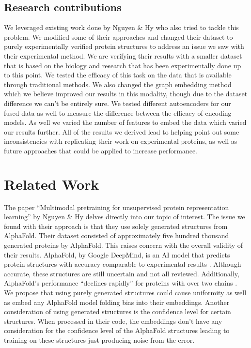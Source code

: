 \documentclass{article}
\begin{document}
\subsection{Research contributions}

We leveraged existing work done by Nguyen \& Hy \citeyearpar{nguyen_2024} who also tried to tackle this problem. We modified some of their approaches and changed their dataset to purely experimentally verified protein structures to address an issue we saw with their experimental method. We are verifying their results with a smaller dataset that is based on the biology and research that has been experimentally done up to this point. We tested the efficacy of this task on the data that is available through traditional methods. We also changed the graph embedding method which we believe improved our results in this modality, though due to the dataset difference we can’t be entirely sure. We tested different autoencoders for our fused data as well to measure the difference between the efficacy of encoding models. As well we varied the number of features to embed the data which varied our results further. All of the results we derived lead to helping point out some inconsistencies with replicating their work on experimental proteins, as well as future approaches that could be applied to increase performance.

\section{Related Work}
The paper “Multimodal pretraining for unsupervised protein representation learning” by Nguyen \& Hy \citeyearpar{nguyen_2024} delves directly into our topic of interest. The issue we found with their approach is that they use solely generated structures from AlphaFold. Their dataset consisted of approximately five hundred thousand generated proteins by AlphaFold. This raises concern with the overall validity of their results. AlphaFold, by Google DeepMind, is an AI model that predicts protein structures with accuracy comparable to experimental results \cite{alphafold}. Although accurate, these structures are still uncertain and not all reviewed. Additionally, AlphaFold’s performance “declines rapidly” for proteins with over two chains \cite{bryant_2022}. We propose that using purely generated structures could cause uniformity as well as embed any AlphaFold model folding bias into their embeddings. Another consideration of using generated structures is the confidence level for certain structures. When processed in their code, the embeddings don’t have any consideration for the confidence level of the AlphaFold structures leading to training on these structures just producing noise from the error. 
\end{document}
